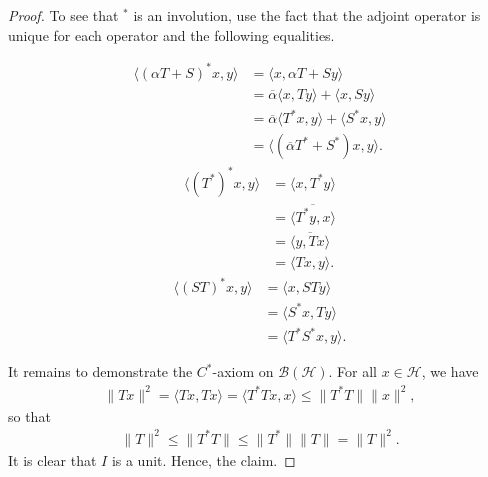 \documentclass[12pt,a4paper]{report}
\theoremstyle{plain}
\theoremstyle{definition}
\newcommand{\1}{\mathbbm{1}}
\renewcommand{\H}{\mathcal{H}}
\newcommand{\B}{\mathcal{B}}
\newcommand{\BH}{\mathcal{\B(\H)}}
\begin{document}
\begin{proof}
	To see that $^\ast$ is an involution, use the fact that the adjoint 
	operator is unique for each operator and the following equalities.
	\begin{enumerate}
	\Item	\begin{align*}
				\langle (\alpha T+S)^\ast x,y\rangle 
			&=	\langle x, \alpha T+S y \rangle									\\
			&=	\overline{\alpha}\langle x,Ty\rangle + \langle x, Sy \rangle	\\
			&=	\overline{\alpha}\langle T^\ast x,y\rangle +
										 \langle S^\ast x, y \rangle			\\
			&=	\langle(\overline{\alpha} T^\ast + S^\ast) x, y \rangle.
			\end{align*}
	\Item 	\begin{align*}
				\langle (T^\ast)^\ast x,y\rangle 
			&=	\langle x, T^\ast y \rangle										\\
			&=	\overline{\langle T^\ast y,x \rangle}							\\
			&=	\overline{\langle y, Tx \rangle}								\\
			&=	\langle Tx,y\rangle.
			\end{align*}
	\Item	\begin{align*}
				\langle (ST)^\ast x,y \rangle
			&=	\langle x, STy \rangle											\\
			&=	\langle	S^\ast x,Ty \rangle										\\
			&=	\langle T^\ast S^\ast x,y \rangle.
		\end{align*}
	\end{enumerate}
	It remains to demonstrate the $C^\ast$-axiom on $\BH$. For all $x\in\H$, we have
	\begin{align*}
		\|Tx\|^2 = \langle Tx,Tx\rangle = \langle T^\ast Tx,x\rangle \leq \|T^\ast T\| \|x\|^2,
	\end{align*}
	so that
	\begin{align*}
		\|T\|^2 \leq \|T^\ast T\| \leq \|T^\ast\| \|T\| = \|T\|^2.
	\end{align*}
	It is clear that $I$ is a unit.
	Hence, the claim.
\end{proof} 



\end{document}
